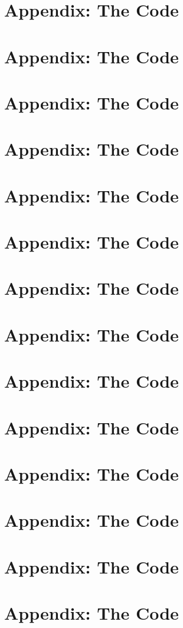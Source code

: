 \documentclass{article}
\begin{document}
\newpage
\section{Appendix: The Code}
\newpage
\section{Appendix: The Code}
\newpage
\section{Appendix: The Code}
\newpage
\section{Appendix: The Code}
\newpage
\section{Appendix: The Code}
\newpage
\section{Appendix: The Code}
\newpage
\section{Appendix: The Code}
\newpage
\section{Appendix: The Code}
\newpage
\section{Appendix: The Code}
\newpage
\section{Appendix: The Code}
\newpage
\section{Appendix: The Code}
\newpage
\section{Appendix: The Code}
\newpage
\section{Appendix: The Code}
\newpage
\section{Appendix: The Code}
\newpage
\end{document}
